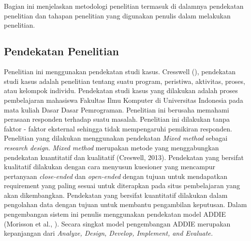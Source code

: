 \chapter{\babTiga}
Bagian ini menjelaskan metodologi penelitian termasuk di dalamnya pendekatan penelitian dan tahapan penelitian yang digunakan penulis dalam melakukan penelitian.
\section{Pendekatan Penelitian}

Penelitian ini  menggunakan pendekatan studi kasus. Cresswell (\citeyear{papper.Creswell}), pendekatan studi kasus adalah penelitian tentang suatu program, peristiwa, aktivitas, proses, atau kelompok individu.
\linebreak\linebreak
Pendekatan studi kasus yang dilakukan adalah proses pembelajaran mahasiswa Fakultas Ilmu Komputer di Universitas Indonesia pada mata kuliah Dasar Dasar Pemrograman. Penelitian ini berusaha memahami perasaan responden terhadap suatu masalah. Penelitian ini dilakukan tanpa faktor - faktor eksternal sehingga tidak mempengaruhi pemikiran responden.
\linebreak\linebreak
Penelitian yang dilakukan menggunakan pendekatan \textit{Mixed method} sebagai \textit{research design}. \textit{Mixed method} merupakan metode yang menggabungkan pendekatan kuantitatif dan kualitatif (Creswell, 2013). Pendekatan yang bersifat kualitatif dilakukan dengan cara menyusun kuesioner yang mencampur pertanyaan \textit{close-ended} dan \textit{open-ended} dengan tujuan untuk mendapatkan requirement yang paling sesuai untuk diterapkan pada situs pembelajaran yang akan dikembangkan. Pendekatan yang bersifat kuantitatif dilakukan dalam pengolahan data dengan tujuan untuk membantu pengambilan keputusan.
\linebreak\linebreak
Dalam pengembangan sistem ini penulis menggunakan pendekatan model ADDIE  (Morisson et al., \citeyear{book.morisson}). Secara singkat model pengembangan ADDIE merupakan kepanjangan dari \textit{Analyze, Design, Develop, Implement, and Evaluate.}

